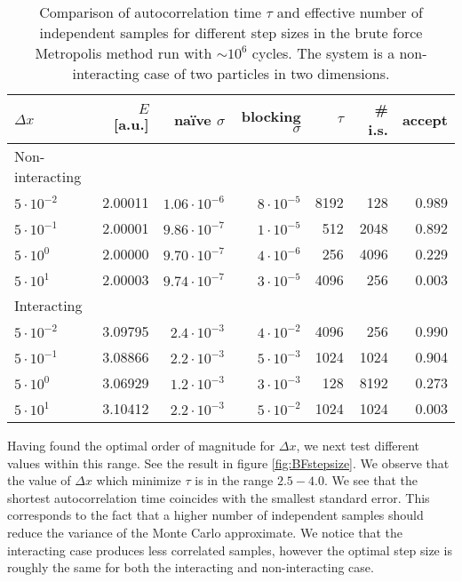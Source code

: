 \documentclass[twoside,english]{uiofysmaster}
\newcommand{\ra}[1]{\renewcommand{\arraystretch}{#1}}
\begin{document}
\begin{table*}\centering
\ra{1.3}
\caption{Comparison of autocorrelation time $\tau$ and effective number of independent samples for different step sizes in the brute force Metropolis method run with $\sim 10^6$ cycles. The system is a non-interacting case of two particles in two dimensions.}
\label{tab:BFstepsize}
\begin{tabular}{lrrrrrr}
\toprule
\toprule
$\Delta x$ & $E$ [a.u.]  & na\"ive $\sigma$ & blocking $\sigma$ & $\tau$ &  \# i.s. & accept \\ 
\midrule 
Non-interacting \\
$5 \cdot 10^{-2}$ & 2.00011 & $1.06 \cdot 10^{-6}$ & $8 \cdot 10^{-5}$ & 8192 & 128  & 0.989 \\
$5 \cdot 10^{-1}$ & 2.00001 & $9.86 \cdot 10^{-7}$ & $1 \cdot 10^{-5}$ & 512  & 2048 & 0.892 \\
$5 \cdot 10^0$    & 2.00000 & $9.70 \cdot 10^{-7}$ & $4 \cdot 10^{-6}$ & 256  & 4096 & 0.229 \\
$5 \cdot 10^1$    & 2.00003 & $9.74 \cdot 10^{-7}$ & $3 \cdot 10^{-5}$ & 4096 & 256  & 0.003 \\
Interacting \\
$5 \cdot 10^{-2}$ & 3.09795 & $2.4 \cdot 10^{-3}$ & $4 \cdot 10^{-2}$ & 4096  & 256  & 0.990 \\
$5 \cdot 10^{-1}$ & 3.08866 & $2.2 \cdot 10^{-3}$ & $5 \cdot 10^{-3}$ & 1024  & 1024 & 0.904 \\
$5 \cdot 10^0$    & 3.06929 & $1.2 \cdot 10^{-3}$ & $3 \cdot 10^{-3}$ & 128   & 8192 & 0.273 \\
$5 \cdot 10^1$    & 3.10412 & $2.2 \cdot 10^{-3}$ & $5 \cdot 10^{-2}$ & 1024  & 1024 & 0.003 \\
\bottomrule
\bottomrule
\end{tabular}
\end{table*}


Having found the optimal order of magnitude for $\Delta x$, we next test different values within this range. See the result in figure \ref{fig:BFstepsize}. We observe that the value of $\Delta x$ which minimize $\tau$ is in the range $2.5-4.0$. We see that the shortest autocorrelation time coincides with the smallest standard error. This corresponds to the fact that a higher number of independent samples should reduce the variance of the Monte Carlo approximate. We notice that the interacting case produces less correlated samples, however the optimal step size is roughly the same for both the interacting and non-interacting case.
\end{document}
